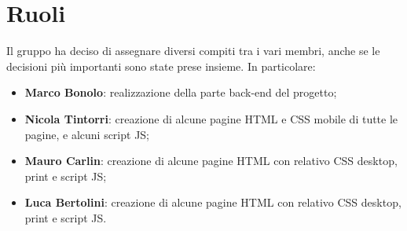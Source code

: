 \section{Ruoli}
Il gruppo ha deciso di assegnare diversi compiti tra i vari membri, anche se le decisioni più importanti sono state prese insieme. In particolare:
\begin{itemize}
	\item \textbf{Marco Bonolo}: realizzazione della parte back-end del progetto;
	\item \textbf{Nicola Tintorri}: creazione di alcune pagine HTML e CSS mobile di tutte le pagine, e alcuni script JS;
	\item \textbf{Mauro Carlin}: creazione di alcune pagine HTML con relativo CSS desktop, print e script JS;
	\item \textbf{Luca Bertolini}: creazione di alcune pagine HTML con relativo CSS desktop, print e script JS.
\end{itemize}